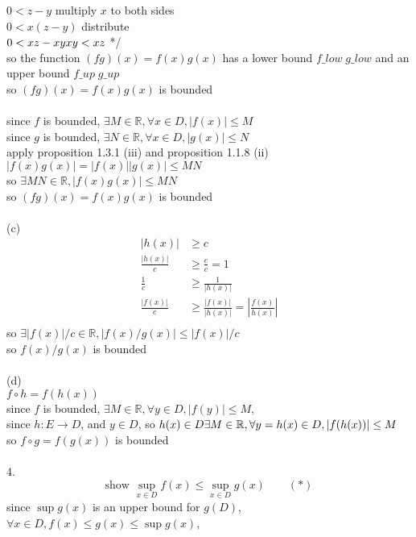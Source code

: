 \documentclass[12pt, border = 4pt, multi]{article} %
\begin{document}
$0 < z - y$ \qquad multiply $x$ to both sides\\
$0 < x(z - y)$ \qquad distribute\\
$0 < xz - xy\\
xy < xz$ */\\
so the function $(fg)(x) = f(x)g(x)$ has a lower bound $f\_low\;g\_low$ and an upper bound $f\_up\;g\_up$\\
so $(fg)(x) = f(x)g(x)$ is bounded\\
\\
since $f$ is bounded, $\exists M \in \mathbb{R}, \forall x \in D, |f(x)| \leq M$\\
since $g$ is bounded, $\exists N \in \mathbb{R}, \forall x \in D, |g(x)| \leq N$\\
apply proposition 1.3.1 (iii) and proposition 1.1.8 (ii)\\
$|f(x)g(x)| = |f(x)||g(x)| \leq MN$\\
so $\exists MN \in \mathbb{R}, |f(x)g(x)| \leq MN$\\
so $(fg)(x) = f(x)g(x)$ is bounded\\
\\
(c)
\begin{align*}
|h(x)| &\geq c\\
\frac{|h(x)|}{c} &\geq \frac{c}{c} = 1\\
\frac{1}{c} &\geq \frac{1}{|h(x)|}\\
\frac{|f(x)|}{c} &\geq \frac{|f(x)|}{|h(x)|} =\left|\frac{f(x)}{h(x)}\right|\\
\end{align*}
so $\exists |f(x)| / c \in \mathbb{R}, |f(x) / g(x)| \leq |f(x)| / c$\\
so $f(x) / g(x)$ is bounded\\
\\
(d)\\
$f \circ h = f(h(x))$\\
since $f$ is bounded, $\exists M \in \mathbb{R}, \forall y \in D, |f(y)| \leq M$,\\
since $h: E \rightarrow D$, and $y \in D$, so $h(x) \in D\\
\exists M \in \mathbb{R}, \forall y = h(x) \in D, |f(h(x))| \leq M$\\
so $f \circ g = f(g(x))$ is bounded\\
\\
4.\\
\[\text{show }\sup_{x \in D} f(x) \leq \sup_{x \in D} g(x) \qquad (*)\]
since $\sup g(x)$ is an upper bound for $g(D)$, $\forall x \in D, f(x) \leq g(x) \leq \sup g(x)$,\\
\end{document}
